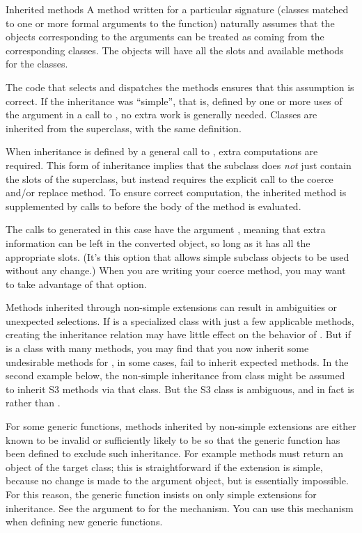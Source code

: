 \begin{Section}{Inherited methods}
A method written for a particular signature (classes matched to one
or more formal arguments to the function) naturally assumes that the
objects corresponding to the arguments can be treated as coming from
the corresponding classes.  The objects will have all the slots and
available methods for the classes.

The code that selects and dispatches the methods ensures that this
assumption is correct.  If the inheritance was ``simple'', that
is, defined by one or more uses of the  argument in
a call to , no extra work is generally
needed.  Classes are inherited from the superclass, with the same
definition.

When inheritance is defined by a general call to
, extra computations are required.  This form of
inheritance implies that the subclass does \emph{not} just contain
the slots of the superclass, but instead requires the explicit call
to the coerce and/or replace method.  To ensure correct computation,
the inherited method is supplemented by calls to 
before the body of the method is evaluated.

The calls to  generated in this case have the
argument , meaning that extra information can
be left in the converted object, so long as it has all the
appropriate slots.  (It's this option that allows simple subclass
objects to be used without any change.)  When you are writing your
coerce method, you may want to take advantage of that option.

Methods inherited through non-simple extensions can result in ambiguities
or unexpected selections.  If  is a specialized class
with just a few applicable methods, creating the inheritance
relation may have little effect on the behavior of .
But if  is a class with many methods, you may
find that you now inherit some undesirable methods for
, in some cases, fail to inherit expected methods.
In the second example below, the non-simple inheritance from class
 might be assumed to inherit S3 methods via that
class.  But the S3 class is ambiguous, and in fact is
 rather than .

For some generic functions, methods inherited by non-simple
extensions are either known to be invalid or sufficiently likely to
be so that the generic function has been defined to exclude such
inheritance.  For example  methods must
return an object of the target class; this is straightforward if the
extension is simple, because no change is made to the argument
object, but is essentially impossible.  For this reason, the generic
function insists on only simple extensions for inheritance.  See the
 argument to 
for the mechanism.  You can use this mechanism when defining new
generic functions.


\end{Section}
